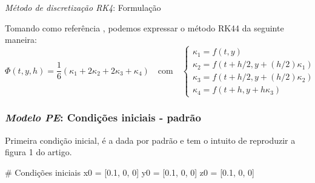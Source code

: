 
\begin{frame}{\textit{Método de discretização RK4}: Formulação}

Tomando como referência \cite{roma2023}, podemos expressar o método RK44 da seguinte maneira:
\begin{equation*}
    \Phi(t,y,h) = \frac{1}{6} \left( \kappa_1 + 2\kappa_2 + 2\kappa_3 + \kappa_4 \right) \quad \text{com} \quad
    \begin{cases}
        \kappa_1 = f(t,y) \\
        \kappa_2 = f \left( t + h/2, y + (h/2) \kappa_1 \right) \\
        \kappa_3 = f \left( t + h/2, y + (h/2) \kappa_2 \right) \\
        \kappa_4 = f \left( t + h, y + h\kappa_3 \right)
    \end{cases}
    \end{equation*}
\end{frame}

\begin{frame}[fragile]
	
	\frametitle{\textit{Modelo PE}: Condições iniciais - padrão}
	Primeira condição inicial, é a dada por padrão e tem o intuito de reproduzir a figura 1 do artigo.    
	\begin{python}
# Condições iniciais
x0 = [0.1, 0, 0]
y0 = [0.1, 0, 0]
z0 = [0.1, 0, 0]
	\end{python}
\end{frame}


